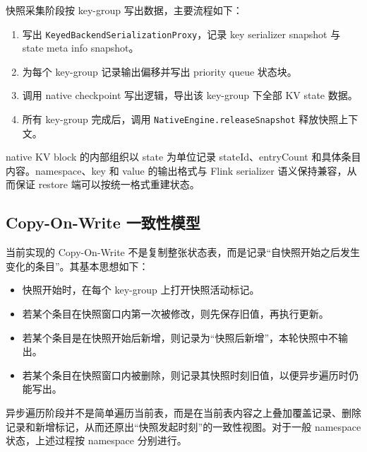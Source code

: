 \documentclass[a4paper,11pt]{article}
\begin{document}
快照采集阶段按 key-group 写出数据，主要流程如下：

\begin{enumerate}
  \item 写出 \texttt{KeyedBackendSerializationProxy}，记录 key serializer snapshot 与 state meta info snapshot。
  \item 为每个 key-group 记录输出偏移并写出 priority queue 状态块。
  \item 调用 native checkpoint 写出逻辑，导出该 key-group 下全部 KV state 数据。
  \item 所有 key-group 完成后，调用 \texttt{NativeEngine.releaseSnapshot} 释放快照上下文。
\end{enumerate}

native KV block 的内部组织以 state 为单位记录 stateId、entryCount 和具体条目内容。namespace、key 和 value 的输出格式与 Flink serializer 语义保持兼容，从而保证 restore 端可以按统一格式重建状态。

\subsection{Copy-On-Write 一致性模型}

当前实现的 Copy-On-Write 不是复制整张状态表，而是记录“自快照开始之后发生变化的条目”。其基本思想如下：

\begin{itemize}
  \item 快照开始时，在每个 key-group 上打开快照活动标记。
  \item 若某个条目在快照窗口内第一次被修改，则先保存旧值，再执行更新。
  \item 若某个条目是在快照开始后新增，则记录为“快照后新增”，本轮快照中不输出。
  \item 若某个条目在快照窗口内被删除，则记录其快照时刻旧值，以便异步遍历时仍能写出。
\end{itemize}

异步遍历阶段并不是简单遍历当前表，而是在当前表内容之上叠加覆盖记录、删除记录和新增标记，从而还原出“快照发起时刻”的一致性视图。对于一般 namespace 状态，上述过程按 namespace 分别进行。
\end{document}
